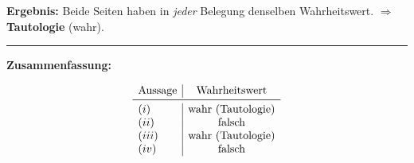 \documentclass{article}
\begin{document}
\textbf{Ergebnis:} Beide Seiten haben in \emph{jeder} Belegung denselben Wahrheitswert.
$\Rightarrow$ \textbf{Tautologie} (wahr).

\bigskip
\hrule
\bigskip
\textbf{Zusammenfassung:}

\[
    \begin{array}{l|c}
        \text{Aussage} & \text{Wahrheitswert}     \\
        \midrule
        (i)            & \text{wahr (Tautologie)} \\
        (ii)           & \text{falsch}            \\
        (iii)          & \text{wahr (Tautologie)} \\
        (iv)           & \text{falsch}            \\
    \end{array}
\]
\end{document}

